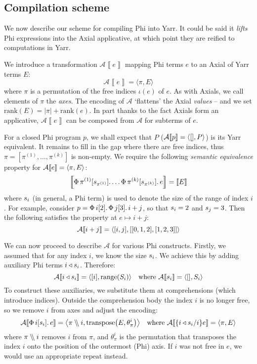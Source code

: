 \needspace{5em}
\subsection{Compilation scheme}

\newcommand{\denot}[1]{\left\llbracket{#1}\right\rrbracket}

We now describe our scheme for compiling Phi into Yarr. It could be said it \textit{lifts} Phi expressions into the Axial applicative, at which point they are reified to computations in Yarr.

We introduce a transformation $\mathcal A \denot{e}$ mapping Phi terms $e$ to an Axial of Yarr terms $E$:
$$ \mathcal A \denot{e} = \langle \pi, E \rangle $$
where $\pi$ is a permutation of the free indices $\iota(e)$ of $e$. As with Axials, we call elements of $\pi$ the \textit{axes}. The encoding of $\mathcal A$ `flattens' the Axial \textit{values} -- and we set $\mathrm{rank}(E) = |\pi| + \mathrm{rank}(e)$. In part thanks to the fact Axials form an applicative, $\mathcal A \denot{e}$ can be composed from $\mathcal A$ for subterms of $e$. 

For a closed Phi program $p$, we shall expect that $P$ ($\mathcal A \denot{p} = \phipair{[]}{P}$) is its Yarr equivalent. It remains to fill in the gap where there are free indices, thus $\pi = \left[ \pi^{(1)}, \dots, \pi^{(k)} \right]$ is non-empty. We require the following \textit{semantic equivalence} property for $\mathcal A \denot e = \phipair{\pi}{E}$:
$$ \denot{\phivec{\pi^{(1)}}{\sizeat{\pi^{(1)}}}{\dots \phivec{\pi^{(k)}}{\sizeat{\pi^{(k)}}}{e}}} = \denot{E}$$
where $s_{i}$ (in general, a Phi term) is used to denote the size of the range of index $i$. For example, consider $p = \Phi\, {i}[{2}] \ldotp {\Phi\, {j}[{3}] \ldotp {i + j}}$, so that $s_{i} = 2$ and $s_{j} = 3$. Then the following satisfies the property at $e \mapsto i + j$:
$$ \mathcal A \denot{i + j} = \phipair{[i, j]}{[[0, 1, 2], [1, 2, 3]]} $$

\newcommand{\sized}[1]{{#1} \triangleleft \sizeat{#1}}
We can now proceed to describe $\mathcal A$ for various Phi constructs. Firstly, we assumed that for any index $i$, we know the size $s_{i}$. We achieve this by adding auxiliary Phi terms $\sized i$. Therefore:
$$ \mathcal A \denot{i \triangleleft \sizeat{i}} 
= \phipair{[i]}{ \mathrm{range} \left( \altsizeat{i} \right) }
\quad 
\text{where } \mathcal A \denot{\sizeat{i}} = \phipair{[]}{\altsizeat{i}} $$
To construct these auxiliaries, we substitute them at comprehensions (which introduce indices). Outside the comprehension body the index $i$ is no longer free, so we  remove $i$ from axes and adjust the encoding:
\newcommand{\dblsetminus}{\mathbin{{\setminus}\mspace{-5mu}{\setminus}}}
$$
\mathcal A \denot{\phivec{i}{\sizeat i}{e}} 
= \phipair{\mathcal \pi \dblsetminus i}{
\mathrm{transpose} \left( E, \theta_\pi^i \right)} 
\quad
\text{where } \mathcal A \denot{\{\sized i / i\} e} 
= \phipair{\pi}{E}
$$
where $\pi \dblsetminus i$ removes $i$ from $\pi$, and $\theta_\pi^i$ is the permutation that transposes the index $i$ onto the position of the outermost (Phi) axis. 
If $i$ was not free in $e$, we would use an appropriate $\mathrm{repeat}$ instead.

